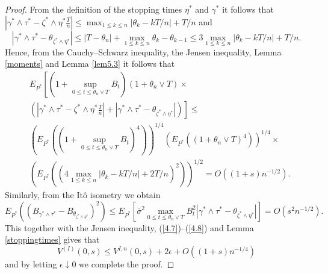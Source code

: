 \documentclass{amsart}
\numberwithin{equation}{section}
\begin{document}
\begin{proof}
From the definition of the stopping times $\eta^*$ and $\gamma^*$ it follows that
$|\gamma^*\wedge\tau^*-\zeta^*\wedge\eta^* \frac{T}{n}|\leq \max_{1\leq k\leq n}|\theta_k-k T/n|+T/n$
and
\[|\gamma^*\wedge\tau^*-\theta_{\zeta^*\wedge\eta^*}|\leq |T-\theta_n|+\max_{1\leq k\leq n}\theta_k-\theta_{k-1}\leq 3\max_{1\leq k\leq n}|\theta_k-k T/n|+T/n.\]
Hence, from the Cauchy--Schwarz inequality, the Jensen inequality,
Lemma \ref{moments} and Lemma \ref{lem5.3} it follows that
\begin{eqnarray}\label{4.8}
&E_{P^*}\left[(1+\sup_{0\leq t\leq\theta_n\vee T} B_t)(1+\theta_n\vee T)\times\right.\\
&\left.(|\gamma^*\wedge\tau^*-\zeta^*\wedge\eta^*\frac{T}{n}|+|\gamma^*\wedge\tau^*-\theta_{\zeta^*\wedge\eta^*}|)\right]\leq\nonumber\\
&\left(E_{P^*}((1+\sup_{0\leq t\leq\theta_n\vee T} B_t)^4)\right)^{1/4}
\left(E_{P^*}((1+\theta_n\vee T)^4)\right)^{1/4}\times\nonumber\\
&\left(E_{P^*}((4 \max_{1\leq k\leq n}|\theta_k-k T/n|+ 2 T/n)^2)\right)^{1/2}=O((1+s) n^{-1/2}).\nonumber
\end{eqnarray}
Similarly, from the It\^{o} isometry we obtain
\[E_{P^*}((B_{\gamma^*\wedge\tau^*}-B_{\theta_{\zeta^*\wedge\eta^*}})^2)\leq E_{P^*}[\overline\sigma^2\max_{0\leq t\leq\theta_n\vee T}B^2_t
|\gamma^*\wedge\tau^*-\theta_{\zeta^*\wedge\eta^*}|]=O(s
^2 n^{-1/2}).\]
This together with the Jensen inequality, (\ref{4.7})--(\ref{4.8}) and Lemma \ref{stoppingtimes}
gives that
$$V^{(I)}(0,s)\leq V^{I,n}(0,s)+2\epsilon+O((1+s) n^{-1/4})$$
and by letting $\epsilon\downarrow 0$ we complete the proof.
\end{proof}
\end{document}
